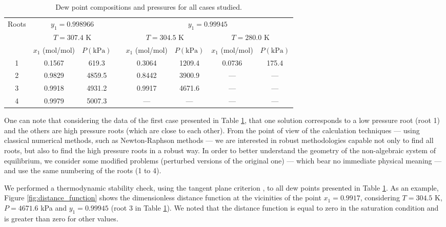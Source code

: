 \documentclass[journal=iecred,manuscript=article]{achemso}
\theoremstyle{definition}
\theoremstyle{remark}
\begin{document}
\begin{table}
\centering
\renewcommand*{\arraystretch}{1.3}
\caption{Dew point compositions and pressures for all cases studied.}
\label{tab:resultados_pontos_orvalho_pressoes}
\begin{tabular}{cccccccc}
\hline\hline
\multirow{3}{*}{Roots} & \multicolumn{2}{c}{$ y_{1} = 0.998966 $} & & \multicolumn{4}{c}{$ y_{1} = 0.99945 $} \\
 & \multicolumn{2}{c}{$ T = 307.4 $ K} & & \multicolumn{2}{c}{$ T = 304.5 $ K} & \multicolumn{2}{c}{$ T = 280.0 $ K} \\ \cline{2-3} \cline{5-8} 
 & $ x_{1} $ (mol/mol) & $ P \left( \textrm{kPa} \right) $ & & $ x_{1} $ (mol/mol) & $ P \left( \textrm{kPa} \right) $ & $ x_{1} $ (mol/mol) & $ P \left( \textrm{kPa} \right) $ \\ \hline
1 & 0.1567 & 619.3 & & 0.3064 & 1209.4 & 0.0736 & 175.4 \\
2 & 0.9829 & 4859.5 & & 0.8442 & 3900.9 & --- & --- \\
3 & 0.9918 & 4931.2 & & 0.9917 & 4671.6 & --- & --- \\
4 & 0.9979 & 5007.3 & & --- & --- & --- & --- \\ \hline\hline
\end{tabular}
\end{table}

One can note that considering the data of the first case presented in Table \ref{tab:resultados_pontos_orvalho_pressoes}, that one solution corresponds to a low pressure root (root 1) and the others are high pressure roots (which are close to each other). From the point of view of the calculation techniques --- using classical numerical methods, such as Newton-Raphson methods --- we are interested in robust methodologies capable not only to find all roots, but also to find  the high pressure roots in a robust way. In order to better understand the geometry of the non-algebraic system of equilibrium, we consider some modified problems (perturbed versions of the original one) --- which bear no immediate physical meaning --- and use the same numbering of the roots (1 to 4).

We performed a thermodynamic stability check, using the tangent plane criterion \citep{michelsen, ngh}, to all dew points presented in Table \ref{tab:resultados_pontos_orvalho_pressoes}. As an example, Figure \ref{fig:distance_function} shows the dimensionless distance function \citep{ngh} at the vicinities of the point $ x_{1} = 0.9917 $, considering $ T = 304.5 $ K, $P = 4671.6$ kPa and $ y_{1} = 0.99945 $ (root 3 in Table \ref{tab:resultados_pontos_orvalho_pressoes}). We noted that the distance function is equal to zero in the saturation condition and is greater than zero for other values.
\end{document}
